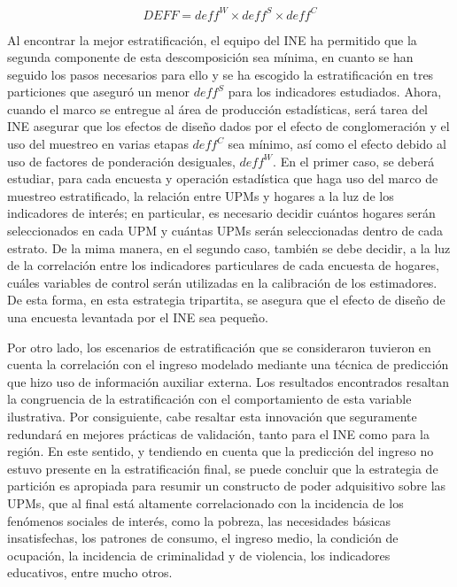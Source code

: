 \documentclass[12pt,spanish,]{book}
\begin{document}
\[
DEFF = deff^W \times deff^S \times deff^C
\]

Al encontrar la mejor estratificación, el equipo del INE ha permitido que la segunda componente de esta descomposición sea mínima, en cuanto se han seguido los pasos necesarios para ello y se ha escogido la estratificación en tres particiones que aseguró un menor \(deff^S\) para los indicadores estudiados. Ahora, cuando el marco se entregue al área de producción estadísticas, será tarea del INE asegurar que los efectos de diseño dados por el efecto de conglomeración y el uso del muestreo en varias etapas \(deff^C\) sea mínimo, así como el efecto debido al uso de factores de ponderación desiguales, \(deff^W\). En el primer caso, se deberá estudiar, para cada encuesta y operación estadística que haga uso del marco de muestreo estratificado, la relación entre UPMs y hogares a la luz de los indicadores de interés; en particular, es necesario decidir cuántos hogares serán seleccionados en cada UPM y cuántas UPMs serán seleccionadas dentro de cada estrato. De la mima manera, en el segundo caso, también se debe decidir, a la luz de la correlación entre los indicadores particulares de cada encuesta de hogares, cuáles variables de control serán utilizadas en la calibración de los estimadores. De esta forma, en esta estrategia tripartita, se asegura que el efecto de diseño de una encuesta levantada por el INE sea pequeño.

Por otro lado, los escenarios de estratificación que se consideraron tuvieron en cuenta la correlación con el ingreso modelado mediante una técnica de predicción que hizo uso de información auxiliar externa. Los resultados encontrados resaltan la congruencia de la estratificación con el comportamiento de esta variable ilustrativa. Por consiguiente, cabe resaltar esta innovación que seguramente redundará en mejores prácticas de validación, tanto para el INE como para la región. En este sentido, y tendiendo en cuenta que la predicción del ingreso no estuvo presente en la estratificación final, se puede concluir que la estrategia de partición es apropiada para resumir un constructo de poder adquisitivo sobre las UPMs, que al final está altamente correlacionado con la incidencia de los fenómenos sociales de interés, como la pobreza, las necesidades básicas insatisfechas, los patrones de consumo, el ingreso medio, la condición de ocupación, la incidencia de criminalidad y de violencia, los indicadores educativos, entre mucho otros.
\end{document}
